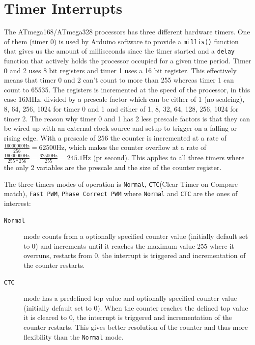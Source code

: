 \documentclass[a4paper, oneside, final]{memoir}
\begin{document}
\section{Timer Interrupts}


The ATmega168/ATmega328 processors has three different hardware
timers. One of them (timer 0) is used by Arduino software to provide a
\texttt{millis()} function that gives us the amount of milliseconds
since the timer started and a \texttt{delay} function that actively
holds the processor occupied for a given time period. Timer 0 and 2
uses 8 bit registers and timer 1 uses a 16 bit register. This
effectively means that timer 0 and 2 can't count to more than 255
whereas timer 1 can count to 65535. The registers is incremented at
the speed of the processor, in this case 16MHz, divided by a prescale
factor which can be either of 1 (no scaleing), 8, 64, 256, 1024 for
timer 0 and 1 and either of 1, 8, 32, 64, 128, 256, 1024 for timer
2. The reason why timer 0 and 1 has 2 less prescale factors is that
they can be wired up with an external clock source and setup to
trigger on a falling or rising edge. With a prescale of 256 the
counter is incremented at a rate of $\frac{16000000\mathrm{Hz}}{256} =
62500\mathrm{Hz}$, which makes the counter overflow at a rate of
$\frac{16000000\mathrm{Hz}}{255*256} = \frac{62500\mathrm{Hz}}{255} =
245.1\mathrm{Hz}$ (pr second). This applies to all three timers where the only
2 variables are the prescale and the size of the counter register.

The three timers modes of operation is \texttt{Normal},
\texttt{CTC}(Clear Timer on Compare match), \texttt{Fast PWM},
\texttt{Phase Correct PWM} where \texttt{Normal} and \texttt{CTC} are
the ones of interrest:

\begin{description}
\item[\texttt{Normal}] mode counts from a optionally specified counter
  value (initially default set to 0) and increments until it reaches
  the maximum value 255 where it overruns, restarts from 0, the
  interrupt is triggered and incrementation of the counter
  restarts.

\item[\texttt{CTC}] mode has a predefined top value and optionally
  specified counter value (initially default set to 0). When the
  counter reaches the defined top value it is cleared to 0, the
  interrupt is triggered and incrementation of the counter
  restarts. This gives better resolution of the counter and thus more
  flexibility than the \texttt{Normal} mode.
\end{description}
\end{document}
